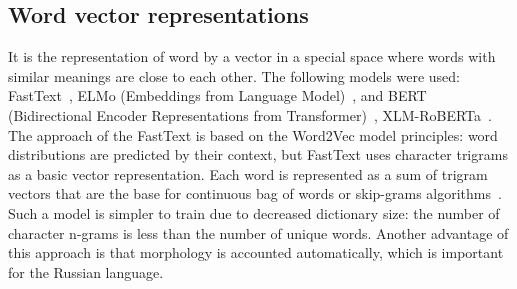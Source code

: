 \documentclass[a4paper,fleqn,longmktitle]{cas-dc}
\begin{document}
\subsection{Word vector representations} 
It is the representation of word by a vector in a special space where words with similar meanings are close to each other. 
The following models were used: FastText~\cite{bojanowski2017enriching}, ELMo (Embeddings from Language Model)~\cite{peters2018deep}, and BERT (Bidirectional Encoder Representations from Transformer)~\cite{devlin2018bert}, XLM-RoBERTa~\cite{xlm_conneau2019unsupervised}.
The approach of the FastText is based on the Word2Vec model principles: word distributions are predicted by their context, but FastText uses character trigrams as a basic vector representation. Each word is represented as a sum of trigram vectors that are the base for continuous bag of words or skip-grams algorithms~\cite{mikolov2013efficient}. Such a model is simpler to train due to decreased dictionary size: the number of character n-grams is less than the number of unique words. Another advantage of this approach is that morphology is accounted automatically, which is important for the Russian language.
\end{document}
